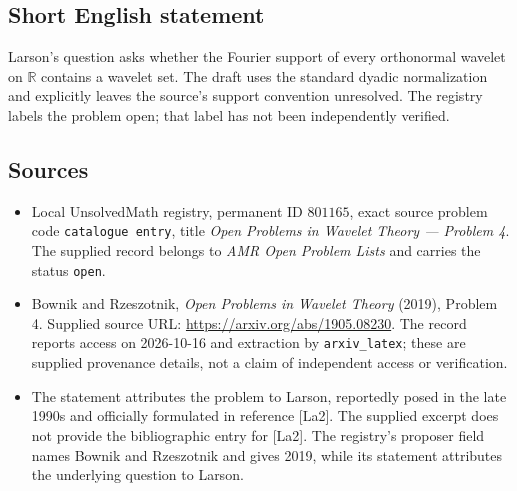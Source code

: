 \documentclass[11pt]{article}
\newcommand{\R}{\mathbb{R}}
\begin{document}
\subsection{Short English statement}
Larson's question asks whether the Fourier support of every orthonormal wavelet on \(\R\) contains a wavelet set. The draft uses the standard dyadic normalization and explicitly leaves the source's support convention unresolved. The registry labels the problem open; that label has not been independently verified.
\subsection{Sources}
\begin{itemize}
\item Local UnsolvedMath registry, permanent ID \(801165\), exact source problem code \texttt{catalogue entry}, title \emph{Open Problems in Wavelet Theory --- Problem 4}. The supplied record belongs to \emph{AMR Open Problem Lists} and carries the status \texttt{open}.
\item Bownik and Rzeszotnik, \emph{Open Problems in Wavelet Theory} (2019), Problem 4. Supplied source URL: \url{https://arxiv.org/abs/1905.08230}. The record reports access on 2026-10-16 and extraction by \texttt{arxiv\_latex}; these are supplied provenance details, not a claim of independent access or verification.
\item The statement attributes the problem to Larson, reportedly posed in the late 1990s and officially formulated in reference [La2]. The supplied excerpt does not provide the bibliographic entry for [La2]. The registry's proposer field names Bownik and Rzeszotnik and gives 2019, while its statement attributes the underlying question to Larson.
\end{itemize}
\end{document}
